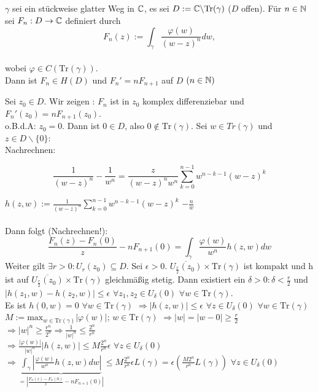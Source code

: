 \documentclass[a4paper,twoside,DIV15,BCOR12mm]{scrbook}
\def\Tr{\text{Tr}}
\begin{document}
\begin{satz}
$\gamma$ sei ein stückweise glatter Weg in $\mathbb{C}$, es sei $D:= \MdC \backslash
\Tr(\gamma)$ ($D$ offen). Für $n \in \mathbb{N}$ sei $F_n: D \to \mathbb{C}$ definiert durch
\[ F_n(z) := \int_{\gamma} \frac{\varphi(w)}{(w-z)^n} dw,\]\\ 
wobei $\varphi \in C(\Tr(\gamma))$. \\
Dann ist $F_n \in H(D)$ und $F_n ' = n F_{n+1}$ auf $D$ $(n\in \mathbb{N})$
\end{satz}

\begin{beweis}
Sei $z_0 \in D.$ Wir zeigen : $F_n$ ist in $z_0$ komplex differenziebar und $F_n'(z_0) =
nF_{n+1}(z_0)$. \\
o.B.d.A: $z_0 = 0$. Dann ist $ 0 \in D$, also $0 \not\in \Tr(\gamma)$. 
Sei $w \in Tr(\gamma)$ und $z \in D \backslash \{0\} $: \\ 
Nachrechnen: 

\[ \frac{1}{(w-z)^n}-\frac{1}{w^n} = \frac{z}{(w-z)^n w^n} 
\sum_{k=0}^{n-1}w^{n-k-1}(w-z)^k \]

$h(z,w) := \frac{1}{(w-z)^n} \sum_{k=0}^{n-1}w^{n-k-1}(w-z)^k$  $-\frac{n}{w}$
\\ \\ Dann folgt (Nachrechnen!): \[ \frac{F_n(z)-F_n(0)}{z}- n F_{n+1}(0) =
\int_{\gamma} \frac{\varphi(w)}{w^n} h(z,w) dw\] 
Weiter gilt $\exists r > 0 : U_r(z_0) \subseteq D$. Sei $\epsilon > 0$.
$\overline{U_{\frac{r}{2}}(z_0)} \times \Tr(\gamma)$ ist kompakt und h ist auf 
$\overline{U_{\frac{r}{2}}(z_0)} \times \Tr(\gamma)$ gleichmäßig stetig.
Dann existiert ein $\delta >0: \delta < \frac{r}{2}$ und $|h(z_1,w) - h(z_2,w)|
\leq \epsilon$ $\forall z_1, z_2 \in U_{\delta}(0)$ $\forall w \in \Tr(\gamma)$.
\\ Es ist $h(0,w) = 0$ $\forall w \in \Tr(\gamma)$ $\Rightarrow |h(z, w)| \leq
\epsilon $ $\forall z \in U_{\delta}(0)$ $ \forall w \in \Tr(\gamma)$ \\
$M := \text{max}_{w \in \Tr(\gamma)}|\varphi(w)|$; $w \in \Tr(\gamma)$ $\Rightarrow |w| =
|w-0| \geq \frac{r}{2}$ \\ $\Rightarrow |w|^n \geq \frac{r^n}{2^n} \Rightarrow
\frac{1}{|w|^n} \leq \frac{2^n}{r^n}$ \\
$\Rightarrow \frac{| \varphi(w) |}{|w|^n }|h(z,w)|  \leq M \frac{2^n}{r^n} \epsilon$ $\forall z \in U_{\delta}(0)$ \\
$\Rightarrow  \underbrace{\int_{\gamma} |\frac{ \varphi(w) }{w^n }h(z,w)dw|}_{= 
|\frac{F_n(z)-F_n(0)}{z}- n F_{n+1}(0)|} \leq  M
\frac{2^n}{r^n} \epsilon L(\gamma) = \epsilon (\frac{M 2^n}{r^n} L(\gamma))$ 
$\forall z \in U_{\delta}(0)$
\end{beweis}
\end{document}
